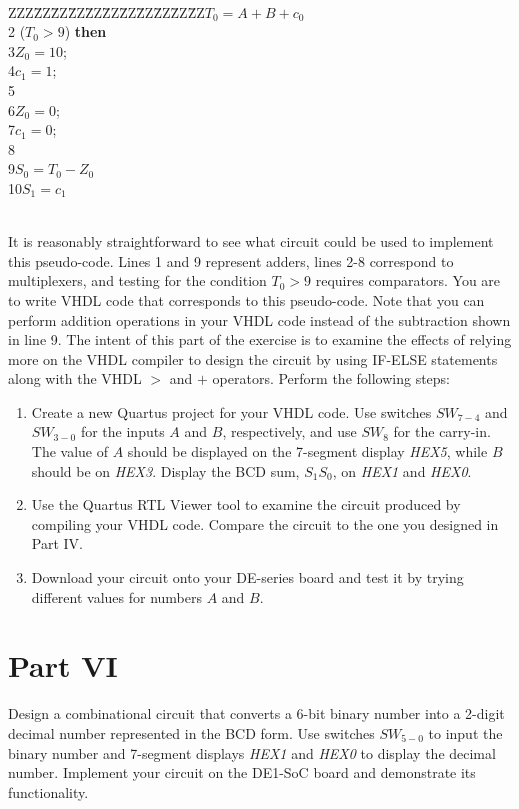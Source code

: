 \documentclass[epsfig,10pt,fullpage]{article}
\newcommand{\CommonDocsPath}{../../../common/docs}
\begin{document}
~\\
\begin{center}
\begin{minipage}[t]{12.5 cm}
\begin{tabbing}
ZZZ\=ZZ\=ZZ\=ZZ\=ZZ\=ZZ\=ZZ\=ZZ\=ZZ\=ZZ\=ZZ\>$T_0 = A + B + c_0$ \\
2 ($T_0 > 9$) {\bf then}\\
3\>\>$Z_0 = 10$;\\
4\>\>$c_1 = 1$;\\
5\\
6\>\>$Z_0 = 0$;\\
7\>\>$c_1 = 0$;\\
8\\
9\>$S_0 = T_0 - Z_0$\\
10\>$S_1 = c_1$\\
\end{tabbing}
\end{minipage}
\end{center}
~\\
It is reasonably straightforward to see what circuit could be used to implement this
pseudo-code. Lines 1 and 9 represent adders, lines 2-8 correspond to
multiplexers, and testing for the condition $T_0 > 9$ requires comparators.
You are to write VHDL code that corresponds to this pseudo-code. Note that you can
perform addition operations in your VHDL code instead of the subtraction shown 
in line 9. The intent of this part of the exercise is
to examine the effects of relying more on the VHDL compiler to design the circuit by using
IF-ELSE statements along with the VHDL $>$ and $+$ operators. 
Perform the following steps:

\begin{enumerate}
\item Create a new Quartus project for your VHDL code. Use switches $SW_{7-4}$ and $SW_{3-0}$ for the inputs $A$ and $B$, respectively, and
use $SW_{8}$ for the carry-in.
The value of $A$ should be displayed on the 7-segment display {\it HEX5}, 
while $B$ should be on {\it HEX3}.
Display the BCD sum, $S_1 S_0$, on {\it HEX1} and {\it HEX0}.
\item Use the Quartus RTL Viewer tool to examine the circuit produced by compiling your
VHDL code. Compare the circuit to the one you designed in Part IV.
\item Download your circuit onto your DE-series board and test it by trying different values for 
numbers $A$ and $B$.
\end{enumerate}

\section*{Part VI}
Design a combinational circuit that converts a 6-bit binary number into 
a 2-digit decimal number represented in the BCD form. 
Use switches $SW_{5-0}$ to input the binary number and 7-segment displays 
{\it HEX1} and {\it HEX0} to display the decimal number.
Implement your circuit on the DE1-SoC board and demonstrate its functionality.


\end{document}
